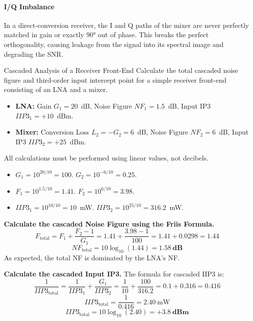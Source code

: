 \paragraph{I/Q Imbalance}
In a direct-conversion receiver, the I and Q paths of the mixer are never perfectly matched in gain or exactly 90° out of phase. This  breaks the perfect orthogonality, causing leakage from the signal into its spectral image and degrading the SNR.

\begin{workedexample}{Cascaded Analysis of a Receiver Front-End}
    Calculate the total cascaded noise figure and third-order input intercept point for a simple receiver front-end consisting of an LNA and a mixer.

    \begin{itemize}
        \item \textbf{LNA:} Gain \(G_1 = 20\)~dB, Noise Figure \(NF_1 = 1.5\)~dB, Input IP3 \(IIP3_1 = +10\)~dBm.
        \item \textbf{Mixer:} Conversion Loss \(L_2 = -G_2 = 6\)~dB, Noise Figure \(NF_2 = 6\)~dB, Input IP3 \(IIP3_2 = +25\)~dBm.
    \end{itemize}

    All calculations must be performed using linear values, not decibels.
    \begin{itemize}
        \item \(G_1 = 10^{20/10} = 100\). \(G_2 = 10^{-6/10} = 0.25\).
        \item \(F_1 = 10^{1.5/10} = 1.41\). \(F_2 = 10^{6/10} = 3.98\).
        \item \(IIP3_1 = 10^{10/10} = 10\)~mW. \(IIP3_2 = 10^{25/10} = 316.2\)~mW.
    \end{itemize}

    \begin{derivationsteps}
        \step \textbf{Calculate the cascaded Noise Figure using the Friis Formula.}
        \[ F_{\text{total}} = F_1 + \frac{F_2 - 1}{G_1} = 1.41 + \frac{3.98 - 1}{100} = 1.41 + 0.0298 = 1.44 \]
        \[ NF_{\text{total}} = 10\log_{10}(1.44) = \mathbf{1.58~\text{dB}} \]
        As expected, the total NF is dominated by the LNA's NF.

        \step \textbf{Calculate the cascaded Input IP3.} The formula for cascaded IIP3 is:
        \[ \frac{1}{IIP3_{\text{total}}} = \frac{1}{IIP3_1} + \frac{G_1}{IIP3_2} = \frac{1}{10} + \frac{100}{316.2} = 0.1 + 0.316 = 0.416 \]
        \[ IIP3_{\text{total}} = \frac{1}{0.416} = 2.40~\text{mW} \]
        \[ IIP3_{\text{total}} = 10\log_{10}(2.40) = \mathbf{+3.8~\text{dBm}} \]
    \end{derivationsteps}


\end{workedexample}
